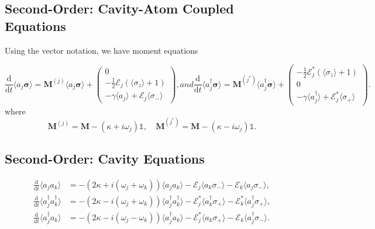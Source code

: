 \documentclass{article}
\newcommand{\ddt}[1][]{\frac{\mathrm{d} #1}{\mathrm{d}t}}
\begin{document}
\subsection{Second-Order: Cavity-Atom Coupled Equations}

Using the vector notation, we have moment equations

\begin{subequations}
	\begin{equation}
		\ddt \langle a_{j} \bm{\sigma} \rangle = \bm{M}^{(j)} \langle a_{j} \bm{\sigma} \rangle + 
		\begin{pmatrix}
			0 \\
			-\frac{1}{2} \mathcal{E}_{j} \left( \langle \sigma_{z} \rangle + 1 \right) \\
			-\gamma \langle a_{j} \rangle + \mathcal{E}_{j} \langle \sigma_{-} \rangle
		\end{pmatrix},
	\end{equation}
	and
	\begin{equation}
		\ddt \langle a^{\dagger}_{j} \bm{\sigma} \rangle = \bm{M}^{(j^{*})} \langle a^{\dagger}_{j} \bm{\sigma} \rangle + 
		\begin{pmatrix}
			-\frac{1}{2} \mathcal{E}_{j}^{*} \left( \langle \sigma_{z} \rangle + 1 \right) \\
			0 \\
			-\gamma \langle a^{\dagger}_{j} \rangle + \mathcal{E}_{j}^{*} \langle \sigma_{+} \rangle
		\end{pmatrix}.
	\end{equation}
\end{subequations}
where
\begin{equation}
	\bm{M}^{(j)} = \bm{M} - \left( \kappa + i \omega_{j} \right) \mathbb{1}, \quad \bm{M}^{(j^{*})} = \bm{M} - \left( \kappa - i \omega_{j} \right) \mathbb{1}.
\end{equation}

\subsection{Second-Order: Cavity Equations}

\begin{subequations}
	\begin{align}
		\ddt \langle a_{j} a_{k} \rangle &= -\left( 2 \kappa + i \left( \omega_{j} + \omega_{k} \right) \right) \langle a_{j} a_{k} \rangle - \mathcal{E}_{j} \langle a_{k} \sigma_{-} \rangle - \mathcal{E}_{k} \langle a_{j} \sigma_{-} \rangle, \\
		\ddt \langle a^{\dagger}_{j} a^{\dagger}_{k} \rangle &= -\left( 2 \kappa - i \left( \omega_{j} + \omega_{k} \right) \right) \langle a^{\dagger}_{j} a^{\dagger}_{k} \rangle - \mathcal{E}_{j}^{*} \langle a^{\dagger}_{k} \sigma_{+} \rangle - \mathcal{E}_{k}^{*} \langle a^{\dagger}_{j} \sigma_{+} \rangle, \\
		\ddt \langle a^{\dagger}_{j} a_{k} \rangle &= -\left( 2 \kappa - i \left( \omega_{j}- \omega_{k} \right) \right) \langle a^{\dagger}_{j} a_{k} \rangle - \mathcal{E}_{j}^{*} \langle a_{k} \sigma_{+} \rangle - \mathcal{E}_{k} \langle a^{\dagger}_{j} \sigma_{-} \rangle.
	\end{align}
\end{subequations}
\end{document}
